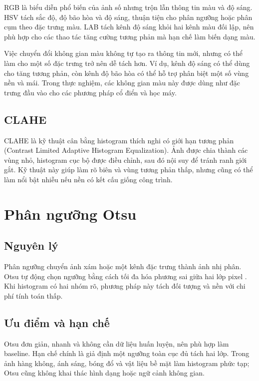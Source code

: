 \documentclass[12pt,a4paper]{report}
\begin{document}
RGB là biểu diễn phổ biến của ảnh số nhưng trộn lẫn thông tin màu và độ sáng. HSV tách sắc độ, độ bão hòa và độ sáng, thuận tiện cho phân ngưỡng hoặc phân cụm theo đặc trưng màu. LAB tách kênh độ sáng khỏi hai kênh màu đối lập, nên phù hợp cho các thao tác tăng cường tương phản mà hạn chế làm biến dạng màu.

Việc chuyển đổi không gian màu không tự tạo ra thông tin mới, nhưng có thể làm cho một số đặc trưng trở nên dễ tách hơn. Ví dụ, kênh độ sáng có thể dùng cho tăng tương phản, còn kênh độ bão hòa có thể hỗ trợ phân biệt một số vùng nền và mái. Trong thực nghiệm, các không gian màu này được dùng như đặc trưng đầu vào cho các phương pháp cổ điển và học máy.

\subsection{CLAHE}

CLAHE là kỹ thuật cân bằng histogram thích nghi có giới hạn tương phản (Contrast Limited Adaptive Histogram Equalization). Ảnh được chia thành các vùng nhỏ, histogram cục bộ được điều chỉnh, sau đó nội suy để tránh ranh giới gắt. Kỹ thuật này giúp làm rõ biên và vùng tương phản thấp, nhưng cũng có thể làm nổi bật nhiễu nếu nền có kết cấu giống công trình.

\section{Phân ngưỡng Otsu}

\subsection{Nguyên lý}

Phân ngưỡng chuyển ảnh xám hoặc một kênh đặc trưng thành ảnh nhị phân. Otsu tự động chọn ngưỡng bằng cách tối đa hóa phương sai giữa hai lớp pixel \cite{otsu1979threshold}. Khi histogram có hai nhóm rõ, phương pháp này tách đối tượng và nền với chi phí tính toán thấp.

\subsection{Ưu điểm và hạn chế}

Otsu đơn giản, nhanh và không cần dữ liệu huấn luyện, nên phù hợp làm baseline. Hạn chế chính là giả định một ngưỡng toàn cục đủ tách hai lớp. Trong ảnh hàng không, ánh sáng, bóng đổ và vật liệu bề mặt làm histogram phức tạp; Otsu cũng không khai thác hình dạng hoặc ngữ cảnh không gian.
\end{document}
